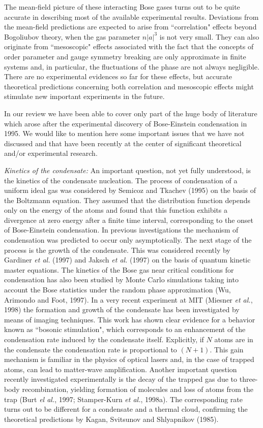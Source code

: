 The mean-field picture of these interacting Bose gases turns out
to be quite accurate in describing most of the available experimental 
results. Deviations from the mean-field predictions are expected to 
arise from ``correlation" effects beyond Bogoliubov theory, when the 
gas parameter $n|a|^3$ is not very small. They can also originate 
from ``mesoscopic" effects associated with the fact that the concepts
of order parameter and gauge symmetry breaking are only approximate
in finite systems and, in particular, the fluctuations of the
phase are not always negligible. There are no experimental evidences 
so far for these effects, but accurate theoretical predictions
concerning both correlation and mesoscopic effects might stimulate
new important experiments in the future.  

In our review we have been able to cover only part of the huge body 
of literature which arose after the experimental discovery of
Bose-Einstein condensation in 1995. We would like to mention here 
some important issues that we have not discussed and
that have been recently at the center of significant theoretical
and/or experimental research.

{\it Kinetics of the condensate:} An important question, not 
yet fully understood,  is the kinetics of the condensate nucleation. 
The process of condensation of a uniform ideal gas was considered 
by Semicoz and Tkachev (1995) on the basis of the Boltzmann equation. 
They assumed that the distribution function depends only on 
the energy of the atoms and found that this function exhibits a 
divergence at zero energy after a finite time interval, corresponding to
the onset of Bose-Einstein condensation. In previous investigations
the mechanism of condensation was predicted to occur only
asymptotically. The next stage of the process is the growth of
the condensate. This was considered recently by Gardiner {\it et al.}
(1997) and Jaksch {\it et al.} (1997) on  the basis of quantum kinetic 
master equations. The kinetics of the Bose gas near critical conditions 
for condensation has also been studied by Monte Carlo simulations 
taking into account the Bose statistics under the random phase 
approximation (Wu, Arimondo and Foot, 1997). In a very recent 
experiment at MIT (Miesner {\it et al.}, 1998) the formation and 
growth of the condensate has been investigated by means of imaging 
techniques. This work has shown clear evidence for a behavior known 
as ``bosonic stimulation", which corresponds to an enhancement of the
condensation rate induced by the condensate itself. Explicitly, if 
$N$ atoms are in the condensate the condensation rate is proportional 
to $(N+1)$. This gain mechanism is familiar in the physics of optical 
lasers and, in the case of trapped atoms, can lead to matter-wave 
amplification. Another important question recently 
investigated experimentally is the decay of the trapped gas due to 
three-body recombination, yielding formation of molecules  and 
loss of atoms from the trap (Burt {\it el al.}, 1997; Stamper-Kurn 
{\it et al.}, 1998a).  The corresponding rate turns out to be
different for a condensate and a thermal cloud, confirming the 
theoretical predictions by Kagan, Svitsunov and Shlyapnikov (1985). 


